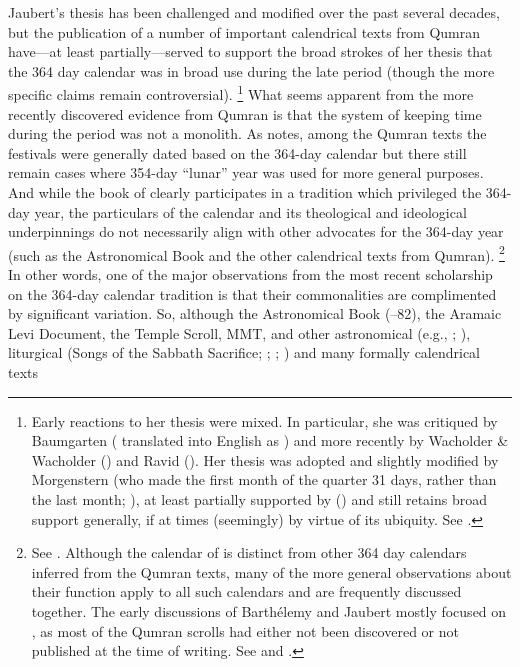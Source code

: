 Jaubert's thesis has been challenged and modified over the past several decades, but the publication of a number of important calendrical texts from Qumran have---at least partially---served to support the broad strokes of her thesis that the 364 day calendar was in broad use during the late \secondtemple period (though the more specific claims remain controversial).%
    \footnote{Early reactions to her thesis were mixed. In particular, she was critiqued by Baumgarten (\cite*{baumgarten_tarbiz1962} translated into English as \cite*{baumgarten_baumgarten1977}) and more recently by Wacholder \& Wacholder (\cite*{wacholder-wacholder_huca1995}) and Ravid (\cite*{ravid_dsd2003}). Her thesis was adopted and slightly modified by Morgenstern (who made the first month of the quarter 31 days, rather than the last month; \cite*{morgenstern_vt1955}), at least partially supported by \vanderkam (\cite*[410--411]{vanderkam_cbq1979}) and still retains broad support generally, if at times (seemingly) by virtue of its ubiquity. See \cite[142]{bendov-saulnier_cbr2008}.}
What seems apparent from the more recently discovered evidence from Qumran is that the system of keeping time during the \secondtemple period was not a monolith. As \vanderkam notes, among the Qumran texts the festivals were generally dated based on the 364-day calendar but there still remain cases where 354-day ``lunar'' year was used for more general purposes.\autocite[1:45]{vanderkam2018} And while the book of \jub clearly participates in a tradition which privileged the 364-day year, the particulars of the \jub calendar and its theological and ideological underpinnings do not necessarily align with other advocates for the 364-day year (such as the Astronomical Book and the other calendrical texts from Qumran).%
    \footnote{See \cite[,159]{bendov-saulnier_cbr2008}. Although the calendar of \jub is distinct from other 364 day calendars inferred from the Qumran texts, many of the more general observations about their function apply to all such calendars and are frequently discussed together. The early discussions of Barthélemy and Jaubert mostly focused on \jub, as most of the Qumran scrolls had either not been discovered or not published at the time of writing. See \cite{barthelemy_rb1952} and \cite{jaubert_vt1957}.}
In other words, one of the major observations from the most recent scholarship on the 364-day calendar tradition is that their commonalities are complimented by significant variation. So, although the Astronomical Book (--82), the Aramaic Levi Document, the Temple Scroll, MMT,  and other astronomical (e.g., ; ), liturgical (Songs of the Sabbath Sacrifice; ; ; ) and many formally calendrical texts%
